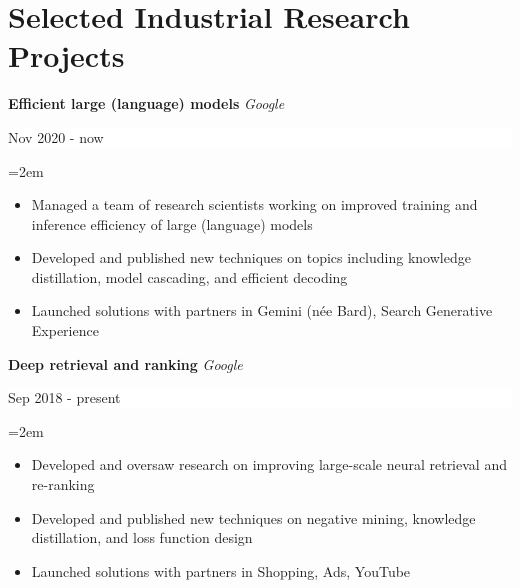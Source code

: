 \documentclass{article}
\newcommand{\NewPart}[1]{\section*{#1}}
\newcommand{\EducationEntry}[4]{
    \noindent \textbf{#1}
    \textit{#3}
    \hfill      %
    \colorbox{White}{
      \parbox{9em}{
      \hfill\color{Black}#2}} \par  %
    \noindent\hangindent=2em\hangafter=0 \small #4 %
    \normalsize \par}
\newcommand{\WorkEntry}[4]{       %
    \noindent
    \textbf{#1}
    \textit{#3} %
    \hfill      %
    \colorbox{White}{%
      \parbox{9em}{%
      \hfill\color{Black}#2}} \par   %
    \noindent\hangindent=2em\hangafter=0 \small #4 %
    \normalsize \par}
\newcommand{\ProjectEntry}[4]{         %
    \noindent \textbf{#1} \noindent {#2} {#3} \par
    \noindent \small #4 %
    \normalsize \par}
\begin{document}




\baselineskip


\NewPart{Selected Industrial Research Projects}{}

\WorkEntry
{Efficient large (language) models}
{Nov 2020 - now}
{Google}
{
\begin{itemize}
    \itemsep-0.1\baselineskip
    \item Managed a team of research scientists working on improved training and inference efficiency of large (language) models
    \item Developed and published new techniques on topics including knowledge distillation, model cascading, and efficient decoding
    \item Launched solutions with partners in Gemini (n\'{e}e Bard), Search Generative Experience
\end{itemize}
}

\WorkEntry
{Deep retrieval and ranking}
{Sep 2018 - present}
{Google}
{
\begin{itemize}
    \itemsep-0.1\baselineskip
    \item Developed and oversaw research on improving large-scale neural retrieval and re-ranking
    \item Developed and published new techniques on negative mining, knowledge distillation, and loss function design
    \item Launched solutions with partners in Shopping, Ads, YouTube
\end{itemize}
}
\end{document}
